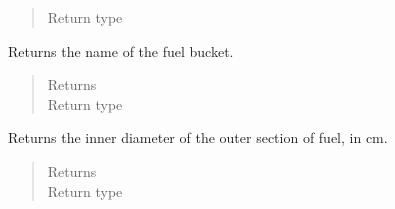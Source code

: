 \documentclass[letterpaper,10pt,openany,oneside,english]{sphinxmanual}
\begin{document}
\begin{fulllineitems}
\begin{fulllineitems}
\begin{quote}
\begin{description}
\item[{Return type}] \leavevmode
{}

\end{description}\end{quote}

\end{fulllineitems}


\begin{fulllineitems}
\label{\detokenize{support_rst/fuel_bucket:fuel_bucket.FuelBucket.get_name}}
Returns the name of the fuel bucket.
\begin{quote}\begin{description}
\item[{Returns}] \leavevmode
{}

\item[{Return type}] \leavevmode
{}

\end{description}\end{quote}

\end{fulllineitems}


\begin{fulllineitems}
\label{\detokenize{support_rst/fuel_bucket:fuel_bucket.FuelBucket.get_outer_slug_id}}
Returns the inner diameter of the outer section of fuel, in cm.
\begin{quote}\begin{description}
\item[{Returns}] \leavevmode
{}

\item[{Return type}] \leavevmode
{}

\end{description}\end{quote}

\end{fulllineitems}



\end{fulllineitems}
\end{document}
